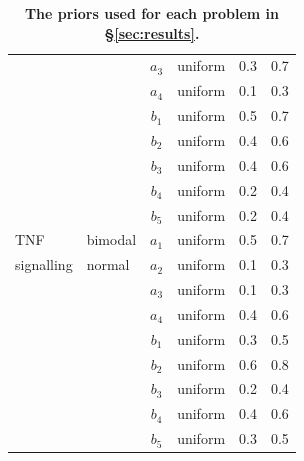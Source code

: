 \begin{table}[htbp]
\begin{adjustwidth}{0in}{0in}
\begin{tabularx}{1.0\textwidth}{llclcc}
&& $a_3$ & uniform & 0.3 & 0.7\\
&& $a_4$ & uniform & 0.1 & 0.3\\
&& $b_1$ & uniform & 0.5 & 0.7\\
&& $b_2$ & uniform & 0.4 & 0.6\\
&& $b_3$ & uniform & 0.4 & 0.6\\
&& $b_4$ & uniform & 0.2 & 0.4\\
&& $b_5$ & uniform & 0.2 & 0.4\\
\toprule
TNF  & bimodal  & $a_1$ & uniform & 0.5 & 0.7\\
signalling& normal & $a_2$ & uniform & 0.1 & 0.3\\
&& $a_3$ & uniform & 0.1 & 0.3\\
&& $a_4$ & uniform & 0.4 & 0.6\\
&& $b_1$ & uniform & 0.3 & 0.5\\
&& $b_2$ & uniform & 0.6 & 0.8\\
&& $b_3$ & uniform & 0.2 & 0.4\\
&& $b_4$ & uniform & 0.4 & 0.6\\
&& $b_5$ & uniform & 0.3 & 0.5\\
\end{tabularx}
\caption{\textbf{The priors used for each problem in \S\ref{sec:results}.}}
\label{tab:priors}
\end{adjustwidth}
\end{table}
